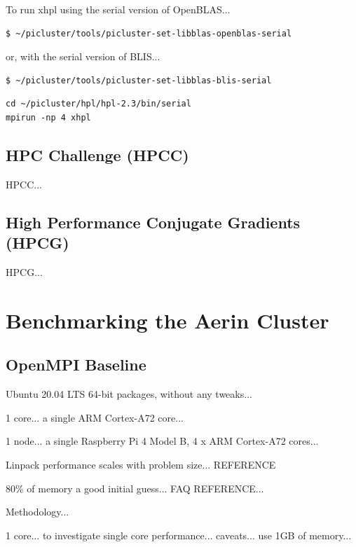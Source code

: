 \documentclass{report}
\begin{document}
To run xhpl using the serial version of OpenBLAS...

\lstset{style=type}
\begin{lstlisting}
$ ~/picluster/tools/picluster-set-libblas-openblas-serial
\end{lstlisting}

or, with the serial version of BLIS...

\lstset{style=type}
\begin{lstlisting}
$ ~/picluster/tools/picluster-set-libblas-blis-serial
\end{lstlisting}


\lstset{style=type}
\begin{lstlisting}
cd ~/picluster/hpl/hpl-2.3/bin/serial
mpirun -np 4 xhpl
\end{lstlisting}


%
%
\section{HPC Challenge (HPCC)}

HPCC...


%
%
\section{High Performance Conjugate Gradients (HPCG)}

HPCG...



%
%
\chapter{Benchmarking the Aerin Cluster}


\section{OpenMPI Baseline}

Ubuntu 20.04 LTS 64-bit packages, without any tweaks...

1 core... a single ARM Cortex-A72 core...

1 node... a single Raspberry Pi 4 Model B, 4 x ARM Cortex-A72 cores...

Linpack performance scales with problem size... REFERENCE

80\% of memory a good initial guess... FAQ REFERENCE...


Methodology...

1 core... to investigate single core performance... caveats... use 1GB of memory...
\end{document}
